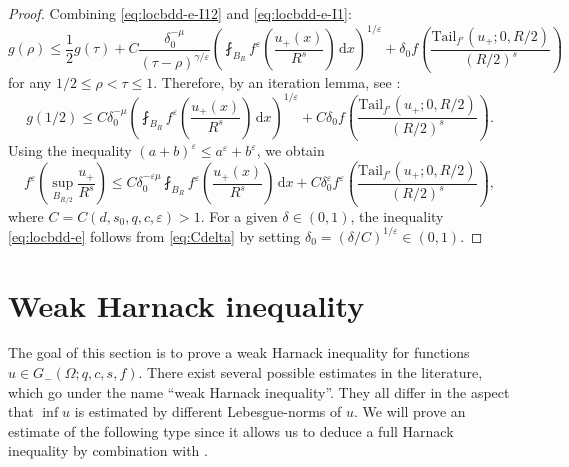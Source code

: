 \documentclass[11pt]{amsart}
\theoremstyle{plain}
\theoremstyle{definition}
\numberwithin{equation}{section}
\newcommand{\dx} {\,\mathrm{d}x}
\begin{document}
\begin{proof}
Combining \eqref{eq:locbdd-e-I12} and \eqref{eq:locbdd-e-I1}:
\begin{equation*}
g(\rho) \leq \frac{1}{2} g(\tau) + C \frac{\delta_0^{-\mu}}{(\tau-\rho)^{\gamma/\varepsilon}} \left( \fint_{B_{R}} f^{\varepsilon} \left( \frac{u_+(x)}{R^s} \right) \dx \right)^{1/\varepsilon} + \delta_0 f\left( \frac{\mathrm{Tail}_{f'}(u_+; 0, R/2)}{(R/2)^s} \right)
\end{equation*}
for any $1/2 \leq \rho < \tau \leq 1$. Therefore, by an iteration lemma, see \cite[Lemma 1.1]{GiGi82}:
\begin{equation*}
g(1/2) \leq C \delta_0^{-\mu} \left( \fint_{B_{R}} f^{\varepsilon} \left( \frac{u_+(x)}{R^s} \right) \dx \right)^{1/\varepsilon} + C \delta_0 f\left( \frac{\mathrm{Tail}_{f'}(u_+; 0, R/2)}{(R/2)^s} \right).
\end{equation*}
Using the inequality $(a+b)^{\varepsilon} \leq a^{\varepsilon} + b^{\varepsilon}$, we obtain
\begin{equation} \label{eq:Cdelta}
f^{\varepsilon} \left( \sup_{B_{R/2}} \frac{u_+}{R^s} \right) \leq C \delta_0^{-\varepsilon\mu} \fint_{B_{R}} f^{\varepsilon} \left( \frac{u_+(x)}{R^s} \right) \dx + C \delta_0^{\varepsilon} f^{\varepsilon} \left( \frac{\mathrm{Tail}_{f'}(u_+; 0, R/2)}{(R/2)^s} \right),
\end{equation}
where $C = C(d, s_0, q, c, \varepsilon) > 1$. For a given $\delta \in (0,1)$, the inequality \eqref{eq:locbdd-e} follows from \eqref{eq:Cdelta} by setting $\delta_0 = (\delta/C)^{1/\varepsilon} \in (0,1)$.
\end{proof}


\section{Weak Harnack inequality} \label{sec:WHI}

The goal of this section is to prove a weak Harnack inequality for functions $u \in G_-(\Omega; q, c, s, f)$. There exist several possible estimates in the literature, which go under the name ``weak Harnack inequality''. They all 
differ in the aspect that $\inf u$ is estimated by different Lebesgue-norms of $u$. We will prove an estimate of the following type since it allows us to deduce a full Harnack inequality by combination with .
\end{document}
